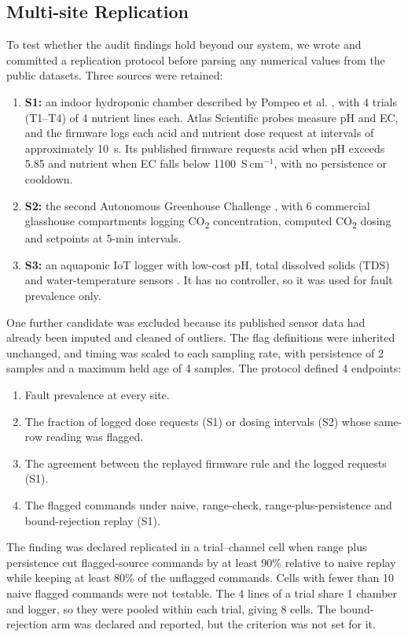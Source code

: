 \documentclass[preprint,12pt,doubleblind]{elsarticle}
\newcommand{\COtwo}{CO\textsubscript{2}}
\begin{document}
\subsection{Multi-site Replication}
\label{sec:multisite}
To test whether the audit findings hold beyond our system, we wrote and committed a replication protocol before parsing any numerical values from the public datasets. Three sources were retained:
\begin{enumerate}
\item \textbf{S1:} an indoor hydroponic chamber described by Pompeo et al. \cite{pompeo2025stability}, with 4 trials (T1--T4) of 4 nutrient lines each. Atlas Scientific probes measure pH and EC, and the firmware logs each acid and nutrient dose request at intervals of approximately 10~s. Its published firmware requests acid when pH exceeds 5.85 and nutrient when EC falls below 1100~\textmu S\,cm$^{-1}$, with no persistence or cooldown.
\item \textbf{S2:} the second Autonomous Greenhouse Challenge \cite{hemming2020agc}, with 6 commercial glasshouse compartments logging \COtwo{} concentration, computed \COtwo{} dosing and setpoints at 5-min intervals.
\item \textbf{S3:} an aquaponic IoT logger with low-cost pH, total dissolved solids (TDS) and water-temperature sensors \cite{siswanto2023aquaponic}. It has no controller, so it was used for fault prevalence only.
\end{enumerate}
One further candidate was excluded because its published sensor data had already been imputed and cleaned of outliers. The flag definitions were inherited unchanged, and timing was scaled to each sampling rate, with persistence of 2 samples and a maximum held age of 4 samples. The protocol defined 4 endpoints:
\begin{enumerate}
\item Fault prevalence at every site.
\item The fraction of logged dose requests (S1) or dosing intervals (S2) whose same-row reading was flagged.
\item The agreement between the replayed firmware rule and the logged requests (S1).
\item The flagged commands under naive, range-check, range-plus-persistence and bound-rejection replay (S1).
\end{enumerate}
The finding was declared replicated in a trial--channel cell when range plus persistence cut flagged-source commands by at least 90\% relative to naive replay while keeping at least 80\% of the unflagged commands. Cells with fewer than 10 naive flagged commands were not testable. The 4 lines of a trial share 1 chamber and logger, so they were pooled within each trial, giving 8 cells. The bound-rejection arm was declared and reported, but the criterion was not set for it.
\end{document}
